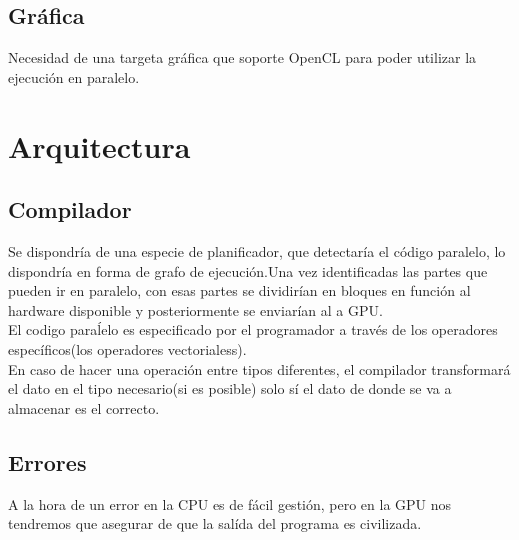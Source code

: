 \documentclass[12pt,a4paper]{article}
\begin{document}
\subsection{Gráfica}
Necesidad de una targeta gráfica que soporte OpenCL para poder utilizar la
ejecución en paralelo.
\section{Arquitectura}
\subsection{Compilador}
Se dispondría de una especie de planificador, que detectaría el código paralelo,
lo dispondría en forma de grafo de ejecución.Una vez identificadas las partes
que pueden ir en paralelo, con esas partes se dividirían en bloques en función
al hardware disponible y posteriormente se enviarían al a GPU.\\
El codigo paraĺelo es especificado por el programador a través de los operadores
específicos(los operadores vectorialess).\\
En caso de hacer una operación entre tipos diferentes, el compilador
transformará el dato en el tipo necesario(si es posible) solo sí el dato de
donde se va a almacenar es el correcto.
\subsection{Errores}
A la hora de un error en la CPU es de fácil gestión, pero en la GPU nos
tendremos que asegurar de que la salída del programa es civilizada.
\end{document}

